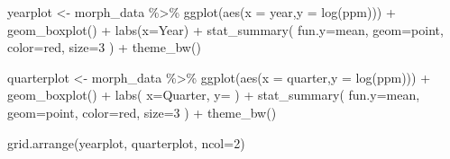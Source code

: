 \documentclass[
  11pt,
]{article}
\newenvironment{Shaded}{\begin{snugshade}}{\end{snugshade}}
\newcommand{\AttributeTok}[1]{\textcolor[rgb]{0.77,0.63,0.00}{#1}}
\newcommand{\DecValTok}[1]{\textcolor[rgb]{0.00,0.00,0.81}{#1}}
\newcommand{\FunctionTok}[1]{\textcolor[rgb]{0.00,0.00,0.00}{#1}}
\newcommand{\NormalTok}[1]{#1}
\newcommand{\OtherTok}[1]{\textcolor[rgb]{0.56,0.35,0.01}{#1}}
\newcommand{\SpecialCharTok}[1]{\textcolor[rgb]{0.00,0.00,0.00}{#1}}
\newcommand{\StringTok}[1]{\textcolor[rgb]{0.31,0.60,0.02}{#1}}
\begin{document}
\begin{Shaded}
\begin{Highlighting}[]
\NormalTok{yearplot }\OtherTok{\textless{}{-}}\NormalTok{ morph\_data }\SpecialCharTok{\%\textgreater{}\%}
  \FunctionTok{ggplot}\NormalTok{(}\FunctionTok{aes}\NormalTok{(}\AttributeTok{x =}\NormalTok{ year,}\AttributeTok{y =} \FunctionTok{log}\NormalTok{(ppm))) }\SpecialCharTok{+}
  \FunctionTok{geom\_boxplot}\NormalTok{() }\SpecialCharTok{+}
  \FunctionTok{labs}\NormalTok{(}\AttributeTok{x=}\StringTok{\textquotesingle{}Year\textquotesingle{}}\NormalTok{) }\SpecialCharTok{+}
  \FunctionTok{stat\_summary}\NormalTok{(}
    \AttributeTok{fun.y=}\NormalTok{mean,}
    \AttributeTok{geom=}\StringTok{\textquotesingle{}point\textquotesingle{}}\NormalTok{,}
    \AttributeTok{color=}\StringTok{\textquotesingle{}red\textquotesingle{}}\NormalTok{,}
    \AttributeTok{size=}\DecValTok{3}
\NormalTok{  ) }\SpecialCharTok{+}
  \FunctionTok{theme\_bw}\NormalTok{()}
\end{Highlighting}
\end{Shaded}

\begin{Shaded}
\begin{Highlighting}[]
\NormalTok{quarterplot }\OtherTok{\textless{}{-}}\NormalTok{ morph\_data }\SpecialCharTok{\%\textgreater{}\%}
  \FunctionTok{ggplot}\NormalTok{(}\FunctionTok{aes}\NormalTok{(}\AttributeTok{x =}\NormalTok{ quarter,}\AttributeTok{y =} \FunctionTok{log}\NormalTok{(ppm))) }\SpecialCharTok{+}
  \FunctionTok{geom\_boxplot}\NormalTok{() }\SpecialCharTok{+}
  \FunctionTok{labs}\NormalTok{(}
    \AttributeTok{x=}\StringTok{\textquotesingle{}Quarter\textquotesingle{}}\NormalTok{,}
    \AttributeTok{y=}\StringTok{\textquotesingle{}\textquotesingle{}}
\NormalTok{  )  }\SpecialCharTok{+}
  \FunctionTok{stat\_summary}\NormalTok{(}
    \AttributeTok{fun.y=}\NormalTok{mean,}
    \AttributeTok{geom=}\StringTok{\textquotesingle{}point\textquotesingle{}}\NormalTok{,}
    \AttributeTok{color=}\StringTok{\textquotesingle{}red\textquotesingle{}}\NormalTok{,}
    \AttributeTok{size=}\DecValTok{3}
\NormalTok{  ) }\SpecialCharTok{+}
  \FunctionTok{theme\_bw}\NormalTok{()}

\FunctionTok{grid.arrange}\NormalTok{(yearplot, quarterplot, }\AttributeTok{ncol=}\DecValTok{2}\NormalTok{)}
\end{Highlighting}
\end{Shaded}
\end{document}
